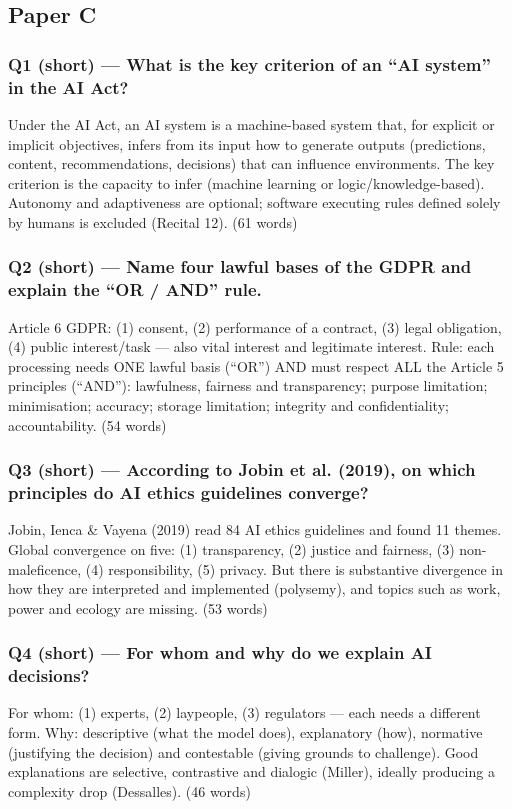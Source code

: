 \documentclass[11pt,a4paper]{article}
\begin{document}
\subsection{Paper C}
\subsubsection*{Q1 (short) — What is the key criterion of an “AI system” in the AI Act?}
Under the AI Act, an AI system is a machine-based system that, for explicit or implicit objectives, infers from its input how to generate outputs (predictions, content, recommendations, decisions) that can influence environments. The key criterion is the capacity to infer (machine learning or logic/knowledge-based). Autonomy and adaptiveness are optional; software executing rules defined solely by humans is excluded (Recital 12). {\small\color{gray}(61 words)}
\subsubsection*{Q2 (short) — Name four lawful bases of the GDPR and explain the “OR / AND” rule.}
Article 6 GDPR: (1) consent, (2) performance of a contract, (3) legal obligation, (4) public interest/task — also vital interest and legitimate interest. Rule: each processing needs ONE lawful basis (“OR”) AND must respect ALL the Article 5 principles (“AND”): lawfulness, fairness and transparency; purpose limitation; minimisation; accuracy; storage limitation; integrity and confidentiality; accountability. {\small\color{gray}(54 words)}
\subsubsection*{Q3 (short) — According to Jobin et al. (2019), on which principles do AI ethics guidelines converge?}
Jobin, Ienca \& Vayena (2019) read 84 AI ethics guidelines and found 11 themes. Global convergence on five: (1) transparency, (2) justice and fairness, (3) non-maleficence, (4) responsibility, (5) privacy. But there is substantive divergence in how they are interpreted and implemented (polysemy), and topics such as work, power and ecology are missing. {\small\color{gray}(53 words)}
\subsubsection*{Q4 (short) — For whom and why do we explain AI decisions?}
For whom: (1) experts, (2) laypeople, (3) regulators — each needs a different form. Why: descriptive (what the model does), explanatory (how), normative (justifying the decision) and contestable (giving grounds to challenge). Good explanations are selective, contrastive and dialogic (Miller), ideally producing a complexity drop (Dessalles). {\small\color{gray}(46 words)}
\end{document}
